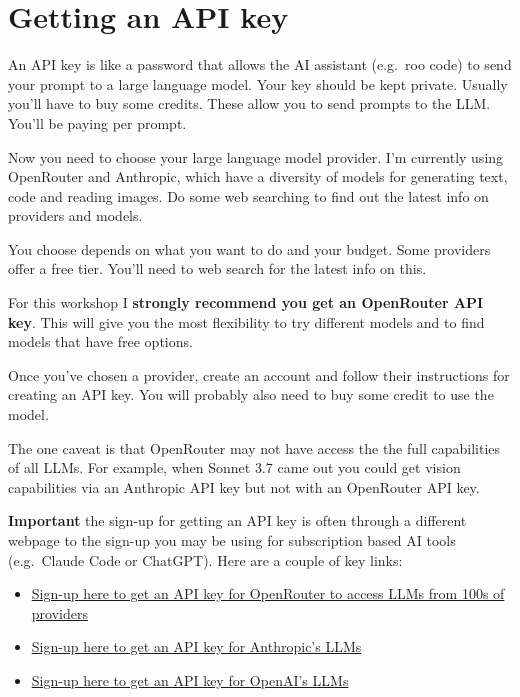 \documentclass[
  letterpaper,
  DIV=11,
  numbers=noendperiod]{scrreprt}
\providecommand{\tightlist}{%
  \setlength{\itemsep}{0pt}\setlength{\parskip}{0pt}}
\begin{document}
\section{Getting an API key}\label{sec-apikeys}

An API key is like a password that allows the AI assistant (e.g.~roo
code) to send your prompt to a large language model. Your key should be
kept private. Usually you'll have to buy some credits. These allow you
to send prompts to the LLM. You'll be paying per prompt.

Now you need to choose your large language model provider. I'm currently
using OpenRouter and Anthropic, which have a diversity of models for
generating text, code and reading images. Do some web searching to find
out the latest info on providers and models.

You choose depends on what you want to do and your budget. Some
providers offer a free tier. You'll need to web search for the latest
info on this.

For this workshop I \textbf{strongly recommend you get an OpenRouter API
key}. This will give you the most flexibility to try different models
and to find models that have free options.

Once you've chosen a provider, create an account and follow their
instructions for creating an API key. You will probably also need to buy
some credit to use the model.

The one caveat is that OpenRouter may not have access the the full
capabilities of all LLMs. For example, when Sonnet 3.7 came out you
could get vision capabilities via an Anthropic API key but not with an
OpenRouter API key.

\textbf{Important} the sign-up for getting an API key is often through a
different webpage to the sign-up you may be using for subscription based
AI tools (e.g.~Claude Code or ChatGPT). Here are a couple of key links:

\begin{itemize}
\tightlist
\item
  \href{https://accounts.openrouter.ai/sign-up}{Sign-up here to get an
  API key for OpenRouter to access LLMs from 100s of providers}
\item
  \href{https://console.anthropic.com/login}{Sign-up here to get an API
  key for Anthropic's LLMs}
\item
  \href{https://auth.openai.com/log-in}{Sign-up here to get an API key
  for OpenAI's LLMs}
\end{itemize}
\end{document}
